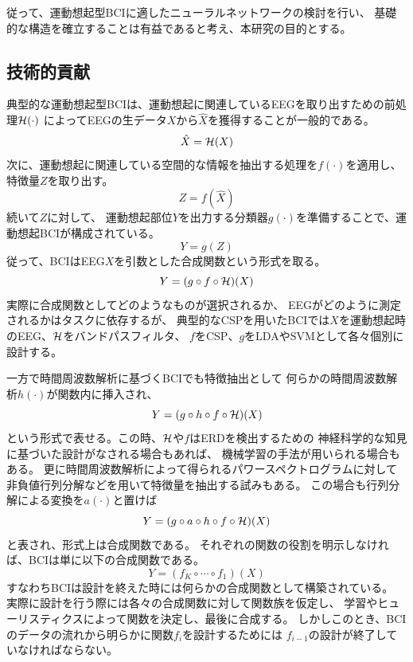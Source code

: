 従って、運動想起型BCIに適したニューラルネットワークの検討を行い、
基礎的な構造を確立することは有益であると考え、本研究の目的とする。

\subsection{\mc 技術的貢献}
典型的な運動想起型BCIは、運動想起に関連しているEEGを取り出すための前処理\(\cal H(\cdot)\)
によってEEGの生データ\(X\)から\(\hat X\)を獲得することが一般的である。
\begin{equation}
    \hat X = {\cal H}(X)
    \label{eq:bandpass}
\end{equation}
次に、運動想起に関連している空間的な情報を抽出する処理を\(f(\cdot)\)を適用し、
特徴量\(Z\)を取り出す。
\begin{equation}
    Z = f(\hat X)
    \label{eq:spatfilter}
\end{equation}
続いて\(Z\)に対して、
運動想起部位\(Y\)を出力する分類器\(g(\cdot)\)を準備することで、運動想起BCIが構成されている。
\begin{equation}
    Y = g(Z)
    \label{eq:classifier}
\end{equation}
従って、BCIはEEG\(X\)を引数とした合成関数という形式を取る。
\begin{equation}
    Y = (g\circ f \circ {\cal H})(X)
    \label{eq:bci_gosei}
\end{equation}
実際に合成関数としてどのようなものが選択されるか、
EEGがどのように測定されるかはタスクに依存するが、
典型的なCSPを用いたBCIでは\(X\)を運動想起時のEEG、\(\cal H\)をバンドパスフィルタ、
\(f\)をCSP、\(g\)をLDAやSVMとして各々個別に設計する。

一方で時間周波数解析に基づくBCIでも特徴抽出として
何らかの時間周波数解析\(h(\cdot)\)が関数内に挿入され、
\begin{equation}
    Y = (g\circ h \circ f \circ {\cal H})(X)
    \label{eq:bci_gosei2}
\end{equation}
という形式で表せる。この時、\(\cal H\)や\(f\)はERDを検出するための
神経科学的な知見に基づいた設計がなされる場合もあれば、
機械学習の手法が用いられる場合もある。
更に時間周波数解析によって得られるパワースペクトログラムに対して
非負値行列分解などを用いて特徴量を抽出する試みもある\cite{kNMF,kNMF2}。
この場合も行列分解による変換を\(a(\cdot)\)と置けば
\begin{equation}
    Y = (g\circ a\circ h\circ f\circ {\cal H})(X)
    \label{eq:bci_gosei3}
\end{equation}
と表され、形式上は合成関数である。
それぞれの関数の役割を明示しなければ、BCIは単に以下の合成関数である。
\begin{equation}
    Y = (f_K\circ \cdots \circ f_1)(X)
    \label{eq:bci_gosei4}
\end{equation}
すなわちBCIは設計を終えた時には何らかの合成関数として構築されている。
実際に設計を行う際には各々の合成関数に対して関数族を仮定し、
学習やヒューリスティクスによって関数を決定し、最後に合成する。
しかしこのとき、BCIのデータの流れから明らかに関数\(f_i\)を設計するためには
\(f_{i-1}\)の設計が終了していなければならない。

